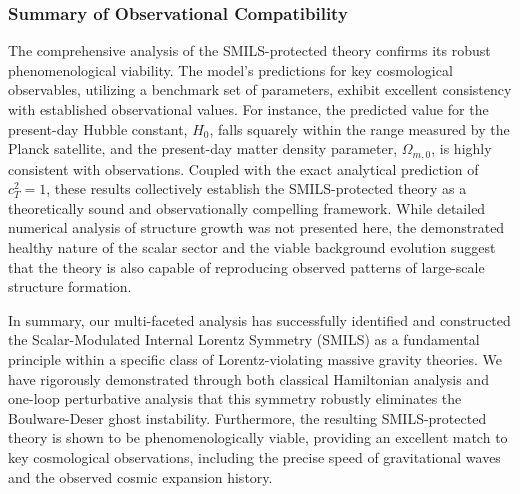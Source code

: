 \documentclass[twocolumn]{aastex631}
\begin{document}
\subsubsection{Summary of Observational Compatibility}
The comprehensive analysis of the SMILS-protected theory confirms its robust phenomenological viability. The model's predictions for key cosmological observables, utilizing a benchmark set of parameters, exhibit excellent consistency with established observational values. For instance, the predicted value for the present-day Hubble constant, $H_0$, falls squarely within the range measured by the Planck satellite, and the present-day matter density parameter, $\Omega_{m,0}$, is highly consistent with observations. Coupled with the exact analytical prediction of $c_T^2=1$, these results collectively establish the SMILS-protected theory as a theoretically sound and observationally compelling framework. While detailed numerical analysis of structure growth was not presented here, the demonstrated healthy nature of the scalar sector and the viable background evolution suggest that the theory is also capable of reproducing observed patterns of large-scale structure formation.

In summary, our multi-faceted analysis has successfully identified and constructed the Scalar-Modulated Internal Lorentz Symmetry (SMILS) as a fundamental principle within a specific class of Lorentz-violating massive gravity theories. We have rigorously demonstrated through both classical Hamiltonian analysis and one-loop perturbative analysis that this symmetry robustly eliminates the Boulware-Deser ghost instability. Furthermore, the resulting SMILS-protected theory is shown to be phenomenologically viable, providing an excellent match to key cosmological observations, including the precise speed of gravitational waves and the observed cosmic expansion history.
\end{document}
